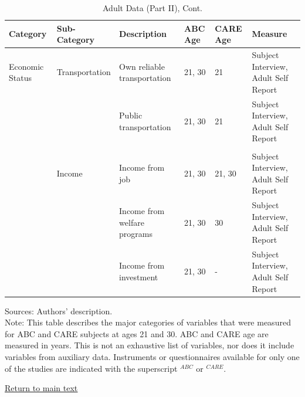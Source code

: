 \documentclass[static]{JJH-Beamer}
\begin{document}
\begin{frame}
 \addtocounter{framenumber}{-1}

\begin{table}[H]
\addtocounter{table}{-1}
\caption{Adult Data (Part II), Cont.}
\begin{center}
\begin{tiny}
\begin{tabular}{L{1.1cm} C{1.4cm} C{2.5cm} C{.8cm} C{.8cm} C{3cm}}
\toprule
\textbf{Category}	&	\textbf{Sub-Category}	&	\textbf{Description}	&	\textbf{ABC Age}  	&  \textbf{CARE Age}  & 	\textbf{Measure}	\\ \midrule										
Economic Status	&	Transportation	&	Own reliable transportation	&	21, 30	&	21	&	Subject Interview, Adult Self Report	\\
	&		&	Public transportation	&	21, 30	&	21	&	Subject Interview, Adult Self Report	\\
\\											
	&	Income	&	Income from job	&	21, 30	&	21, 30	&	Subject Interview, Adult Self Report	\\
	&		&	Income from welfare programs	&	21, 30	&	30	&	Subject Interview, Adult Self Report	\\
	&		&	Income from investment	&	21, 30	&	-	&	Subject Interview, Adult Self Report	\\										
 \bottomrule
\end{tabular}					
\end{tiny}
\end{center}												
\end{table}

\end{frame}

{\flushleft \normalsize Sources: Authors' description. \\				
Note: This table describes the major categories of variables that were measured for ABC and CARE subjects at ages 21 and 30. ABC and CARE age are measured in years. This is not an exhaustive list of variables, nor does it include variables from auxiliary data. Instruments or questionnaires available for only one of the studies are indicated with the superscript $^{ABC}$ or $^{CARE}$.\\}	

\begin{frame}
 \addtocounter{framenumber}{-1}

\begin{center}
\hyperlink{ret:potatochips}{\underline{Return to main text}}
\end{center}

\end{frame}
\end{document}
